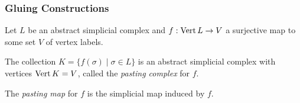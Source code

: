 \begin{multicols*}{3}
\subsubsection{Gluing Constructions}
\vspace{-0.2pc}
Let $L$ be an abstract simplicial complex and $f:\operatorname{Vert} L \to V$ a surjective map to some set $V$ of vertex labels. \vspace{-0.5pc}
\begin{definition} The collection $K=\{f (\sigma) \mid \sigma \in L\} $ is an abstract simplicial complex with vertices $\operatorname{Vert} K = V$, called the \emph{pasting complex} for $f$.
\end{definition}
\rspace
\begin{defi}
The \emph{pasting map} for $f$ is the simplicial map induced by $f$.
\end{defi}
\vspace{-0.5pc}

\end{multicols*}
